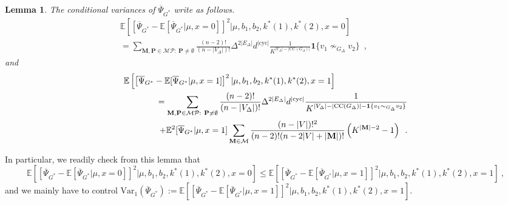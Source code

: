 \documentclass{article}
\newtheorem{lemma}{Lemma}
\begin{document}
\begin{lemma}\label{lem:UBva}
The conditional variances of $\overline{\Psi}_{G^*}$ write as follows. 
    \begin{align*}
 \mathbb{E}\left[\left[\overline{\Psi}_{G^*} - \mathbb E[\overline{\Psi}_{G^*}|\mu,x=0]\right]^2 |\mu,b_1,b_2,k^*(1),k^*(2), x=0\right]\hspace{3cm}\\ 
 =  \sum_{\mathbf{M},\mathbf{P}\in \mathcal{MP}:~\mathbf{P} \neq \emptyset} \frac{(n-2)!}{(n-|V_{\Delta}|)!} \Delta^{2|E_{\Delta}|}d^{|\mathrm{cyc}|}\frac{1}{K^{|V_{\Delta}|-|\mathrm{CC}(G_{\Delta})|}}  \mathbf{1}\{v_1 \nsim_{G_\Delta} v_2\}\enspace , 
    \end{align*}
and 
\begin{align*}
 \mathbb{E}\left[\left[\overline{\Psi}_{G^*} - \mathbb E[\overline{\Psi}_{G^*}|\mu,x=1]\right]^2 |\mu,b_1,b_2,k^*(1),k^*(2), x=1\right]\hspace{3cm}\\
 =  \sum_{\mathbf{M},\mathbf{P}\in \mathcal{MP}:~\mathbf{P} \neq \emptyset} \frac{(n-2)!}{(n-|V_{\Delta}|)!} \Delta^{2|E_{\Delta}|}d^{|\mathrm{cyc}|}\frac{1}{K^{|V_{\Delta}|-|\mathrm{CC}(G_{\Delta})|-\mathbf{1}\{v_1 \sim_{G_\Delta} v_2\}}}   \\ 
  \quad \quad \quad \quad + \mathbb E^2[\overline{\Psi}_{G^*}|\mu,x=1]   \sum_{\mathbf{M}\in  \mathcal{M} }   \frac{(n-|V|)!^2}{(n-2)!(n-2|V|+|\mathbf{M}|)! } \left(K^{|\mathbf{M}|- 2}-1\right)
 \enspace . \noindent 
\end{align*}
%
\end{lemma}
In particular, we readily check from this lemma that 
\[
 \mathbb{E}\left[\left[\overline{\Psi}_{G^*} - \mathbb E[\overline{\Psi}_{G^*}|\mu,x=0]\right]^2 |\mu,b_1,b_2,k^*(1),k^*(2), x=0\right]\leq \mathbb{E}\left[\left[\overline{\Psi}_{G^*} - \mathbb E[\overline{\Psi}_{G^*}|\mu,x=1]\right]^2 |\mu,b_1,b_2,k^*(1),k^*(2), x=1\right]\ , 
\]
and we mainly have to control $\mathrm{Var}_1(\overline{\Psi}_{G^*}):=\mathbb{E}\left[\left[\overline{\Psi}_{G^*} - \mathbb E[\overline{\Psi}_{G^*}|\mu,x=1]\right]^2 |\mu,b_1,b_2,k^*(1),k^*(2), x=1\right]$.
\end{document}
